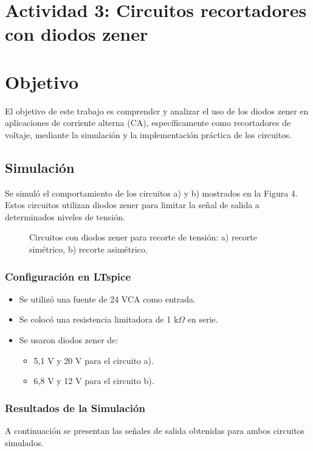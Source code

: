 \newpage

\section{Actividad 3: Circuitos recortadores con diodos zener}

\section*{Objetivo}
El objetivo de este trabajo es comprender y analizar el uso de los diodos zener en aplicaciones de corriente alterna (CA), específicamente como recortadores de voltaje, mediante la simulación y la implementación práctica de los circuitos.


\subsection{Simulación}
Se simuló el comportamiento de los circuitos a) y b) mostrados en la Figura 4. Estos circuitos utilizan diodos zener para limitar la señal de salida a determinados niveles de tensión.

\begin{figure}[H]
    \centering
    \caption{Circuitos con diodos zener para recorte de tensión: a) recorte simétrico, b) recorte asimétrico.}
\end{figure}

\subsubsection*{Configuración en LTspice}
\begin{itemize}
    \item Se utilizó una fuente de 24 VCA como entrada.
    \item Se colocó una resistencia limitadora de 1 k$\Omega$ en serie.
    \item Se usaron diodos zener de:
    \begin{itemize}
        \item 5,1 V y 20 V para el circuito a).
        \item 6,8 V y 12 V para el circuito b).
    \end{itemize}
\end{itemize}

\subsubsection*{Resultados de la Simulación}
A continuación se presentan las señales de salida obtenidas para ambos circuitos simulados.

